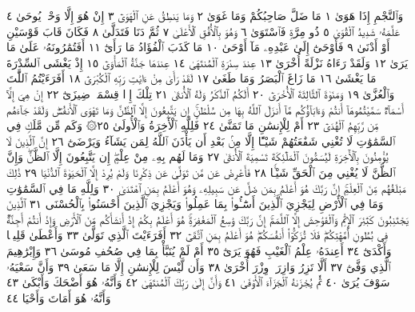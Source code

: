 وَٱلنَّجْمِ إِذَا هَوَىٰ ١ مَا ضَلَّ صَاحِبُكُمْ وَمَا غَوَىٰ ٢ وَمَا يَنطِقُ عَنِ
ٱلْهَوَىٰٓ ٣ إِنْ هُوَ إِلَّا وَحْيࣱ يُوحَىٰ ٤ عَلَّمَهُۥ شَدِيدُ ٱلْقُوَىٰ ٥ ذُو مِرَّةࣲ
فَٱسْتَوَىٰ ٦ وَهُوَ بِٱلْأُفُقِ ٱلْأَعْلَىٰ ٧ ثُمَّ دَنَا فَتَدَلَّىٰ ٨ فَكَانَ قَابَ
قَوْسَيْنِ أَوْ أَدْنَىٰ ٩ فَأَوْحَىٰٓ إِلَىٰ عَبْدِهِۦ مَآ أَوْحَىٰ ١٠ مَا كَذَبَ ٱلْفُؤَادُ
مَا رَأَىٰٓ ١١ أَفَتُمَٰرُونَهُۥ عَلَىٰ مَا يَرَىٰ ١٢ وَلَقَدْ رَءَاهُ نَزْلَةً أُخْرَىٰ ١٣
عِندَ سِدْرَةِ ٱلْمُنتَهَىٰ ١٤ عِندَهَا جَنَّةُ ٱلْمَأْوَىٰٓ ١٥ إِذْ يَغْشَى ٱلسِّدْرَةَ
مَا يَغْشَىٰ ١٦ مَا زَاغَ ٱلْبَصَرُ وَمَا طَغَىٰ ١٧ لَقَدْ رَأَىٰ مِنْ ءَايَٰتِ رَبِّهِ
ٱلْكُبْرَىٰٓ ١٨ أَفَرَءَيْتُمُ ٱللَّٰتَ وَٱلْعُزَّىٰ ١٩ وَمَنَوٰةَ ٱلثَّالِثَةَ ٱلْأُخْرَىٰٓ ٢٠
أَلَكُمُ ٱلذَّكَرُ وَلَهُ ٱلْأُنثَىٰ ٢١ تِلْكَ إِذࣰا قِسْمَةࣱ ضِيزَىٰٓ ٢٢ إِنْ هِيَ إِلَّآ أَسْمَآءࣱ
سَمَّيْتُمُوهَآ أَنتُمْ وَءَابَآؤُكُم مَّآ أَنزَلَ ٱللَّهُ بِهَا مِن سُلْطَٰنٍۚ إِن يَتَّبِعُونَ إِلَّا
ٱلظَّنَّ وَمَا تَهْوَى ٱلْأَنفُسُۖ وَلَقَدْ جَآءَهُم مِّن رَّبِّهِمُ ٱلْهُدَىٰٓ ٢٣ أَمْ لِلْإِنسَٰنِ
مَا تَمَنَّىٰ ٢٤ فَلِلَّهِ ٱلْأٓخِرَةُ وَٱلْأُولَىٰ ٢٥۞ وَكَم مِّن مَّلَكࣲ فِي ٱلسَّمَٰوَٰتِ
لَا تُغْنِي شَفَٰعَتُهُمْ شَيْـًٔا إِلَّا مِنۢ بَعْدِ أَن يَأْذَنَ ٱللَّهُ لِمَن يَشَآءُ وَيَرْضَىٰٓ ٢٦
إِنَّ ٱلَّذِينَ لَا يُؤْمِنُونَ بِٱلْأٓخِرَةِ لَيُسَمُّونَ ٱلْمَلَٰٓئِكَةَ تَسْمِيَةَ ٱلْأُنثَىٰ ٢٧
وَمَا لَهُم بِهِۦ مِنْ عِلْمٍۖ إِن يَتَّبِعُونَ إِلَّا ٱلظَّنَّۖ وَإِنَّ ٱلظَّنَّ لَا يُغْنِي مِنَ
ٱلْحَقِّ شَيْـࣰٔا ٢٨ فَأَعْرِضْ عَن مَّن تَوَلَّىٰ عَن ذِكْرِنَا وَلَمْ يُرِدْ إِلَّا ٱلْحَيَوٰةَ
ٱلدُّنْيَا ٢٩ ذَٰلِكَ مَبْلَغُهُم مِّنَ ٱلْعِلْمِۚ إِنَّ رَبَّكَ هُوَ أَعْلَمُ بِمَن ضَلَّ عَن
سَبِيلِهِۦ وَهُوَ أَعْلَمُ بِمَنِ ٱهْتَدَىٰ ٣٠ وَلِلَّهِ مَا فِي ٱلسَّمَٰوَٰتِ وَمَا فِي
ٱلْأَرْضِ لِيَجْزِيَ ٱلَّذِينَ أَسَٰٓـُٔوا۟ بِمَا عَمِلُوا۟ وَيَجْزِيَ ٱلَّذِينَ أَحْسَنُوا۟
بِٱلْحُسْنَى ٣١ ٱلَّذِينَ يَجْتَنِبُونَ كَبَٰٓئِرَ ٱلْإِثْمِ وَٱلْفَوَٰحِشَ إِلَّا ٱللَّمَمَۚ
إِنَّ رَبَّكَ وَٰسِعُ ٱلْمَغْفِرَةِۚ هُوَ أَعْلَمُ بِكُمْ إِذْ أَنشَأَكُم مِّنَ ٱلْأَرْضِ
وَإِذْ أَنتُمْ أَجِنَّةࣱ فِي بُطُونِ أُمَّهَٰتِكُمْۖ فَلَا تُزَكُّوٓا۟ أَنفُسَكُمْۖ هُوَ أَعْلَمُ
بِمَنِ ٱتَّقَىٰٓ ٣٢ أَفَرَءَيْتَ ٱلَّذِي تَوَلَّىٰ ٣٣ وَأَعْطَىٰ قَلِيلࣰا وَأَكْدَىٰٓ ٣٤
أَعِندَهُۥ عِلْمُ ٱلْغَيْبِ فَهُوَ يَرَىٰٓ ٣٥ أَمْ لَمْ يُنَبَّأْ بِمَا فِي صُحُفِ
مُوسَىٰ ٣٦ وَإِبْرَٰهِيمَ ٱلَّذِي وَفَّىٰٓ ٣٧ أَلَّا تَزِرُ وَازِرَةࣱ وِزْرَ أُخْرَىٰ ٣٨
وَأَن لَّيْسَ لِلْإِنسَٰنِ إِلَّا مَا سَعَىٰ ٣٩ وَأَنَّ سَعْيَهُۥ سَوْفَ يُرَىٰ ٤٠
ثُمَّ يُجْزَىٰهُ ٱلْجَزَآءَ ٱلْأَوْفَىٰ ٤١ وَأَنَّ إِلَىٰ رَبِّكَ ٱلْمُنتَهَىٰ ٤٢
وَأَنَّهُۥ هُوَ أَضْحَكَ وَأَبْكَىٰ ٤٣ وَأَنَّهُۥ هُوَ أَمَاتَ وَأَحْيَا ٤٤
